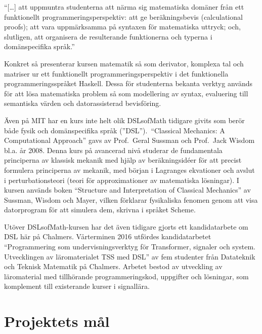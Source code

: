 \begin{draft}
\begin{center}
  ``[\dots] att uppmuntra studenterna att närma sig matematiska domäner från ett
  funktionellt programmeringsperspektiv: att ge beräkningsbevis (calculational
  proofs); att vara uppmärksamma på syntaxen för matematiska uttryck; och,
  slutligen, att organisera de resulterande funktionerna och typerna i
  domänspecifika språk.''\cite{lecture-notes}\cite{tfpie2015} 
\end{center}

Konkret så presenterar kursen matematik så som derivator, komplexa
tal och matriser ur ett funktionellt programmeringsperspektiv i det funktionella programmeringsspråket  %
Haskell. Dessa för studenterna bekanta verktyg används för att lösa
matematiska problem så som modellering av syntax, evaluering till
semantiska värden och datorassisterad bevisföring.

Även på MIT har en kurs inte helt olik DSLsofMath tidigare givits som berör både
fysik och domänspecifika språk (''DSL'').\ ``Classical Mechanics: A Computational Approach'' gavs av
Prof.\ Geral Sussman och Prof.\ Jack Wisdom bl.a. år
2008.\cite{classical-mechanics-course-mit-2008}
Denna kurs på avancerad nivå studerar de fundamentala principerna av klassisk
mekanik med hjälp av beräkningsidéer för att precist formulera principerna av
mekanik, med början i Lagranges ekvationer och avslut i
perturbationsteori (teori för approximationer av matematiska lösningar). I kursen används boken ``Structure and %
Interpretation of Classical Mechanics'' av Sussman, Wisdom och Mayer,
vilken förklarar fysikaliska fenomen genom att visa datorprogram för att
simulera dem, skrivna i språket Scheme.\cite{SICM}

Utöver DSLsofMath-kursen har det även tidigare gjorts ett kandidatarbete om DSL 
här på Chalmers. Vårterminen 2016 utfördes kandidatarbetet
``Programmering som undervisningsverktyg för Transformer, signaler och
system. Utvecklingen av läromaterialet TSS med DSL'' av fem studenter
från Datateknik och Teknisk Matematik på Chalmers. Arbetet bestod av
utveckling av läromaterial med tillhörande programmeringskod,
uppgifter och lösningar, som komplement till existerande kurser i
signallära.\cite{kandidat2016}
\end{draft}

%

\section{Projektets mål}

